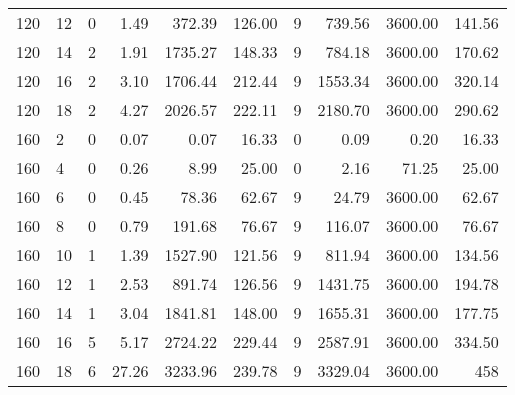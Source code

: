 \begin{appendices}
\begin{table*}[h]
\begin{center}
\begin{tabular} {l l | r r r r | r r r r}
 120 & 12                                &   0             & 1.49          &  372.39     &  126.00      &  9           &  739.56   &  3600.00    &  141.56          \\ 
 120 & 14                                &   2             & 1.91          &  1735.27    &  148.33      &  9           &  784.18   &  3600.00    &  170.62          \\ 
 120 & 16                                &   2             & 3.10          &  1706.44    &  212.44      &  9           &  1553.34  &  3600.00    &  320.14          \\ 
 120 & 18                                &   2             & 4.27          &  2026.57    &  222.11      &  9           &  2180.70  &  3600.00    &  290.62          \\ 
 160 & 2                                 &   0             & 0.07          &  0.07       &  16.33       &  0           &  0.09     &  0.20       &  16.33           \\ 
 160 & 4                                 &   0             & 0.26          &  8.99       &  25.00       &  0           &  2.16     &  71.25      &  25.00           \\ 
 160 & 6                                 &   0             & 0.45          &  78.36      &  62.67       &  9           &  24.79    &  3600.00    &  62.67           \\ 
 160 & 8                                 &   0             & 0.79          &  191.68     &  76.67       &  9           &  116.07   &  3600.00    &  76.67           \\ 
 160 & 10                                &   1             & 1.39          &  1527.90    &  121.56      &  9           &  811.94   &  3600.00    &  134.56          \\ 
 160 & 12                                &   1             & 2.53          &  891.74     &  126.56      &  9           &  1431.75  &  3600.00    &  194.78          \\ 
 160 & 14                                &   1             & 3.04          &  1841.81    &  148.00      &  9           &  1655.31  &  3600.00    &  177.75          \\ 
 160 & 16                                &   5             & 5.17          &  2724.22    &  229.44      &  9           &  2587.91  &  3600.00    &  334.50          \\ 
 160 & 18                                &   6             & 27.26         &  3233.96    &  239.78      &  9           &  3329.04  &  3600.00    &  458             \\ 

\end{tabular}
\end{center}
\end{table*}
\end{appendices}
